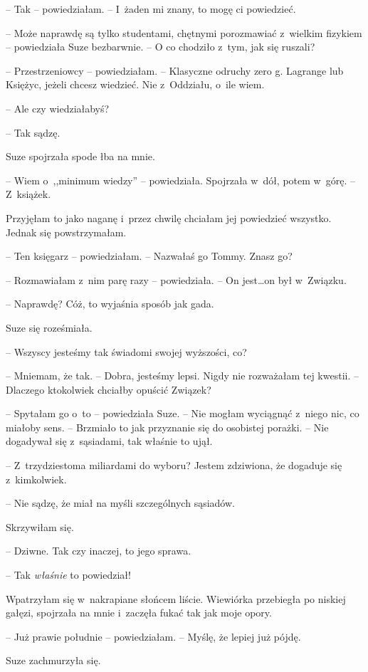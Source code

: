 \documentclass[oneside,polish,11pt,sfheadings]{mwbk}
\begin{document}
-- Tak -- powiedziałam. -- I~żaden mi znany, to mogę ci powiedzieć.

-- Może naprawdę są tylko studentami, chętnymi porozmawiać z~wielkim
fizykiem -- powiedziała Suze bezbarwnie. -- O co chodziło z~tym, jak się
ruszali?

-- Przestrzeniowcy -- powiedziałam. -- Klasyczne odruchy zero g. Lagrange
lub Księżyc, jeżeli chcesz wiedzieć. Nie z~Oddziału, o~ile wiem.

-- Ale czy wiedziałabyś?

-- Tak sądzę.

Suze spojrzała spode łba na mnie. 

-- Wiem o~,,minimum wiedzy'' -- powiedziała. Spojrzała w~dół, potem w~górę. -- Z~książek.

Przyjęłam to jako naganę i~przez chwilę chciałam jej powiedzieć
wszystko. Jednak się powstrzymałam.

-- Ten księgarz -- powiedziałam. -- Nazwałaś go Tommy. Znasz go?

-- Rozmawiałam z~nim parę razy -- powiedziała. -- On jest\ldots  on był w~Związku.

-- Naprawdę? Cóż, to wyjaśnia sposób jak gada.

Suze się roześmiała. 

-- Wszyscy jesteśmy tak świadomi swojej wyższości,
co?

-- Mniemam, że tak. -- Dobra, jesteśmy lepsi. Nigdy nie rozważałam tej
kwestii. -- Dlaczego ktokolwiek chciałby opuścić Związek?

-- Spytałam go o~to -- powiedziała Suze. -- Nie mogłam wyciągnąć z~niego
nic, co miałoby sens. -- Brzmiało to jak przyznanie się do osobistej
porażki. -- Nie dogadywał się z~sąsiadami, tak właśnie to ujął.

-- Z~trzydziestoma miliardami do wyboru? Jestem zdziwiona, że dogaduje
się z~kimkolwiek.

-- Nie sądzę, że miał na myśli szczególnych sąsiadów.

Skrzywiłam się. 

-- Dziwne. Tak czy inaczej, to jego sprawa.

-- Tak \textit{właśnie} to powiedział!

Wpatrzyłam się w~nakrapiane słońcem liście. Wiewiórka przebiegła po
niskiej gałęzi, spojrzała na mnie i~zaczęła fukać tak jak moje opory.

-- Już prawie południe -- powiedziałam. -- Myślę, że lepiej już pójdę.

Suze zachmurzyła się. 
\end{document}
